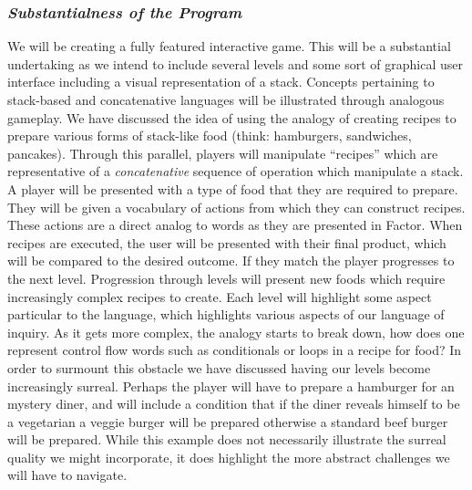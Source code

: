 \documentclass{sig-alternate}
\begin{document}
\subsubsection*{\textit{Substantialness of the Program}}
We will be
creating a fully featured interactive game. This will be a substantial
undertaking as we intend to include several levels and some sort of
graphical user interface including a visual representation of a stack.
Concepts pertaining to stack-based and concatenative languages will be
illustrated through analogous gameplay. We have discussed the idea of
using the analogy of creating recipes to prepare various forms of
stack-like food (think: hamburgers, sandwiches, pancakes). Through
this parallel, players will manipulate ``recipes'' which are
representative of a \textit{concatenative} sequence of operation which
manipulate a stack. A player will be presented with a type of food
that they are required to prepare. They will be given a vocabulary of
actions from which they can construct recipes. These actions are a
direct analog to words as they are presented in Factor. When recipes
are executed, the user will be presented with their final product,
which will be compared to the desired outcome. If they match the
player progresses to the next level. Progression through levels will
present new foods which require increasingly complex recipes to
create. Each level will highlight some aspect particular to the
language, which highlights various aspects of our language of inquiry.
As it gets more complex, the analogy starts to break down, how does
one represent control flow words such as conditionals or loops in a
recipe for food? In order to surmount this obstacle we have discussed
having our levels become increasingly surreal.  Perhaps the player
will have to prepare a hamburger for an mystery diner, and will
include a condition that if the diner reveals himself to be a
vegetarian a veggie burger will be prepared otherwise a standard beef
burger will be prepared. While this example does not necessarily
illustrate the surreal quality we might incorporate, it does highlight
the more abstract challenges we will have to navigate.
\end{document}
